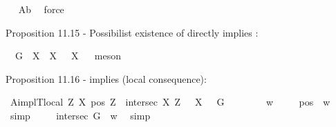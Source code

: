 \begin{isabellebody}
\isadelimproof
\ %
\endisadelimproof
%
\isatagproof
{}\isamarkupfalse%
\ A{}b\ \isamarkupfalse%
\ force%
\endisatagproof
{\isafoldproof}%
%
\isadelimproof
%
\endisadelimproof
%
\begin{isamarkuptext}%
Proposition 11.15 - Possibilist existence of  directly implies :%
\end{isamarkuptext}\isamarkuptrue%
\isamarkupfalse%
\ {\isachardoublequoteopen}{\isasymlfloor}\isactrlbold {\isasymexists}\ G{\isacharasterisk}\ \isactrlbold {\isasymrightarrow}\ {\isacharparenleft}\isactrlbold {\isasymforall}X{\isachardot}\ \isactrlbold {\isasymnot}{\isacharparenleft}{\isasymP}\ X{\isacharparenright}\ \isactrlbold {\isasymrightarrow}\ {\isasymP}\ {\isacharparenleft}\isactrlbold {\isasymrightharpoondown}X{\isacharparenright}{\isacharparenright}{\isasymrfloor}{\isachardoublequoteclose}%
\isadelimproof
\ %
\endisadelimproof
%
\isatagproof
{}\isamarkupfalse%
\ meson%
\endisatagproof
{\isafoldproof}%
%
\isadelimproof
%
\endisadelimproof
%
\begin{isamarkuptext}%
Proposition 11.16 -  implies  (local consequence):%
\end{isamarkuptext}\isamarkuptrue%
\isamarkupfalse%
\ A{}implT{}{\isacharunderscore}local{\isacharcolon}\ {\isachardoublequoteopen}{\isasymlfloor}{\isacharparenleft}\isactrlbold {\isasymforall}Z\ X{\isachardot}\ {\isacharparenleft}pos\ Z\ \isactrlbold {\isasymand}\ intersec\ X\ Z{\isacharparenright}\ \isactrlbold {\isasymrightarrow}\ {\isasymP}\ X{\isacharparenright}\ \isactrlbold {\isasymrightarrow}\ {\isasymP}\ G{\isasymrfloor}{\isachardoublequoteclose}\isanewline
%
\isadelimproof
%
\endisadelimproof
%
\isatagproof
{}\isamarkupfalse%
\ {\isacharminus}\isanewline
\ \ \isacommand{{\isacharbraceleft}}\isamarkupfalse%
\isanewline
\ \ \isamarkupfalse%
\ w\isanewline
\ \ \isamarkupfalse%
\ {}{\isacharcolon}\ {\isachardoublequoteopen}pos\ {\isasymP}\ w{\isachardoublequoteclose}\ \isamarkupfalse%
\ simp\isanewline
\ \ \isamarkupfalse%
\ {}{\isacharcolon}\ {\isachardoublequoteopen}intersec\ G\ {\isasymP}\ w{\isachardoublequoteclose}\ \isamarkupfalse%
\ simp\isanewline
\ \ \isacommand{{\isacharbraceleft}}\isamarkupfalse%
\ \ \ \ \isanewline
\ \ \ \ \isamarkupfalse%

\end{isabellebody}
